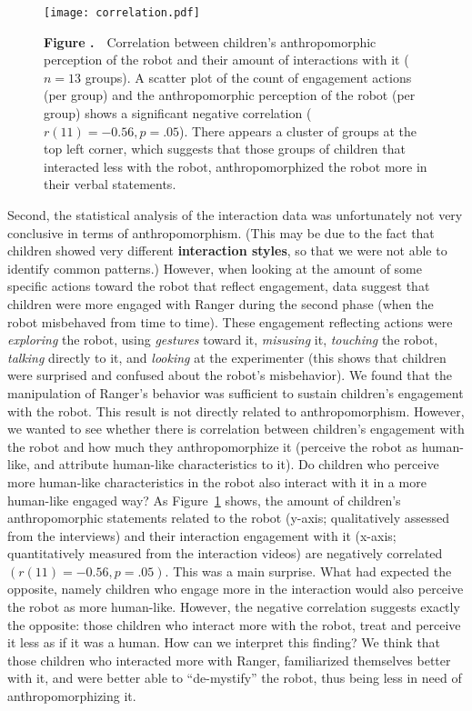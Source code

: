 \documentclass{frontiersSCNS} %
\begin{document}
\begin{figure}
\begin{center}
\texttt{[image: correlation.pdf]}%
\end{center}
 \textbf{\label{fig:correlation} Figure .}{~~\small Correlation between children's anthropomorphic perception of the robot and their amount of interactions with it ($n = 13$ groups). A scatter plot of the count of engagement actions (per group) and the anthropomorphic perception of the robot (per group) shows a significant negative correlation ($r(11)=-0.56, p=.05$). There appears a cluster of groups at the top left corner, which suggests that those groups of children that interacted less with the robot, anthropomorphized the robot more in their verbal statements.}
\end{figure}

Second, the statistical analysis of the interaction data was unfortunately not very conclusive in terms of anthropomorphism. (This may be due to the fact that children showed very different \textbf{interaction styles}, so that we were not able to identify common patterns.) However, when looking at the amount of some specific actions toward the robot that reflect engagement, data suggest that children were more engaged with Ranger during the second phase (when the robot misbehaved from time to time). These engagement reflecting actions were \textit{exploring} the robot, using \textit{gestures} toward it, \textit{misusing} it, \textit{touching} the robot, \textit{talking} directly to it, and \textit{looking} at the experimenter (this shows that children were surprised and confused about the robot's misbehavior). We found that the manipulation of Ranger's behavior was sufficient to sustain children's engagement with the robot. This result is not directly related to anthropomorphism. However, we wanted to see whether there is correlation between children's engagement with the robot and how much they anthropomorphize it (perceive the robot as human-like, and attribute human-like characteristics to it). Do children who perceive more human-like characteristics in the robot also interact with it in a more human-like engaged way?
As Figure~\ref{fig:correlation} shows, the amount of children's anthropomorphic statements related to the robot (y-axis; qualitatively assessed from the interviews) and their interaction engagement with it (x-axis; quantitatively measured from the interaction videos) are negatively correlated $(r(11)=-0.56, p=.05)$. This was a main surprise. What had expected the opposite, namely children who engage more in the interaction would also perceive the robot as more human-like. However, the negative correlation suggests exactly the opposite: those children who interact more with the robot, treat and perceive it less as if it was a human. How can we interpret this finding? We think that those children who interacted more with Ranger, familiarized themselves better with it, and were better able to ``de-mystify'' the robot, thus being less in need of anthropomorphizing it.
\end{document}
